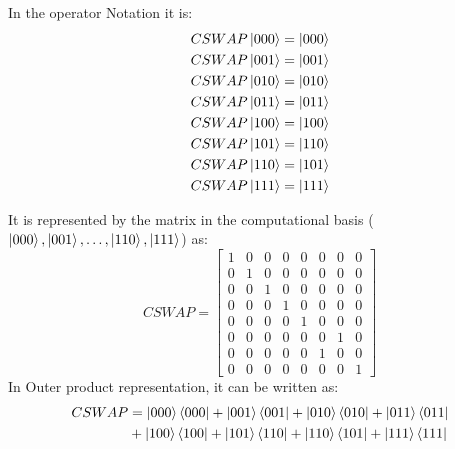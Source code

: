 In the operator Notation it is:
\begin{align*}
    CSWAP\ket{000}&=\ket{000} \\
    CSWAP\ket{001}&=\ket{001} \\
    CSWAP\ket{010}&=\ket{010} \\
    CSWAP\ket{011}&=\ket{011} \\
    CSWAP\ket{100}&=\ket{100} \\
    CSWAP\ket{101}&=\ket{110} \\
    CSWAP\ket{110}&=\ket{101} \\
    CSWAP\ket{111}&=\ket{111}
\end{align*}

It is represented by the matrix in the computational basis ($\ket{000},\ket{001},\ldots,\ket{110},\ket{111}$) as:
\[
    CSWAP=\begin{bmatrix}
        1 & 0 & 0 & 0 & 0 & 0 & 0 & 0 \\
        0 & 1 & 0 & 0 & 0 & 0 & 0 & 0 \\
        0 & 0 & 1 & 0 & 0 & 0 & 0 & 0 \\
        0 & 0 & 0 & 1 & 0 & 0 & 0 & 0 \\
        0 & 0 & 0 & 0 & 1 & 0 & 0 & 0 \\
        0 & 0 & 0 & 0 & 0 & 0 & 1 & 0 \\
        0 & 0 & 0 & 0 & 0 & 1 & 0 & 0 \\
        0 & 0 & 0 & 0 & 0 & 0 & 0 & 1
    \end{bmatrix}
\]
In Outer product representation, it can be written as:
\begin{align*}
    CSWAP&=\ket{000}\bra{000}+\ket{001}\bra{001}+\ket{010}\bra{010}+\ket{011}\bra{011} \\
    &+\ket{100}\bra{100}+\ket{101}\bra{110}+\ket{110}\bra{101}+\ket{111}\bra{111}
\end{align*}

